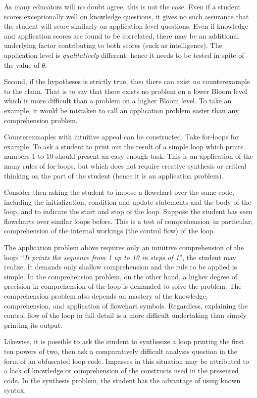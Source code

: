 As many educators will no doubt agree, this is not the case. Even if a student
scores exceptionally well on knowledge questions, it gives no such assurance
that the student will score similarly on application-level questions.  Even if
knowledge and application scores are found to be correlated, there may be an
additional underlying factor contributing to both scores (such as
intelligence).  The application level is \emph{qualitatively} different; hence
it needs to be tested in spite of the value of $\theta$.

Second, if the hypotheses is strictly true, then there can exist no
counterexample to the claim.  That is to say that there exists no problem on a
lower Bloom level which is more difficult than a problem on a higher Bloom
level.  To take an example, it would be mistaken to call an application problem
easier than any comprehension problem. 

Counterexmaples with intuitive appeal can be constructed.  Take for-loops for
example.  To ask a student to print out the result of a simple loop which
prints numbers 1 to 10 should present an easy enough task.  This is an
application of the many rules of for-loops, but which does not require creative
synthesis or critical thinking on the part of the student (hence it is an
application problem). 

Consider then asking the student to impose a flowchart over the same code,
including the initialization, condition and update statements and the body of
the loop, and to indicate the start and stop of the loop.  Suppose the student
has seen flowcharts over similar loops before.  This is a test of
comprehension--in particular, comprehension of the internal workings (the
control flow) of the loop.    

The application problem above requires only an intuitive comprehension of the
loop: ``\emph{It prints the sequence from 1 up to 10 in steps of 1}'', the
student may realize.  It demands only shallow comprehension and the rule to be
applied is simple.  In the comprehension problem, on the other hand, a higher
degree of precision in comprehension of the loop is demanded to solve the
problem.  The comprehension problem also depends on mastery of the knowledge,
comprehension, and application of flowchart symbols.  Regardless, explaining
the control flow of the loop in full detail is a more difficult undertaking
than simply printing its output. 

Likewise, it is possible to ask the student to synthesize a loop printing the
first ten powers of two, then ask a comparatively difficult analysis question
in the form of an obfuscated loop code.  Impasses in this situation may be
attributed to a lack of knowledge or comprehension of the constructs used in
the presented code.  In the synthesis problem, the student has the advantage
of using known syntax. 

